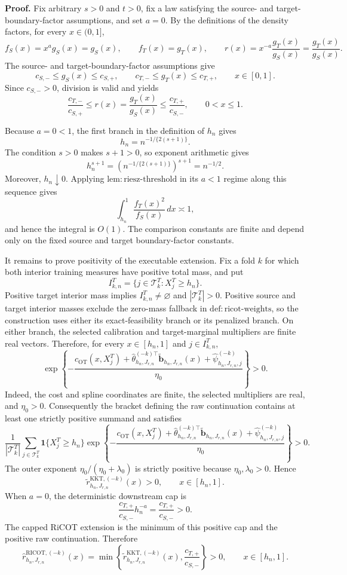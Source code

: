 \textbf{Proof.}
Fix arbitrary \(s>0\) and \(t>0\), fix a law satisfying the source- and target-boundary-factor assumptions, and set \(a=0\). By the definitions of the density factors, for every \(x\in(0,1]\),
\[
f_S(x)=x^a g_S(x)=g_S(x),
\qquad
f_T(x)=g_T(x),
\qquad
r(x)=x^{-a}\frac{g_T(x)}{g_S(x)}=\frac{g_T(x)}{g_S(x)}.
\]
The source- and target-boundary-factor assumptions give
\[
c_{S,-}\le g_S(x)\le c_{S,+},
\qquad
c_{T,-}\le g_T(x)\le c_{T,+},
\qquad x\in[0,1].
\]
Since \(c_{S,-}>0\), division is valid and yields
\[
\frac{c_{T,-}}{c_{S,+}}
\le r(x)=\frac{g_T(x)}{g_S(x)}
\le \frac{c_{T,+}}{c_{S,-}},
\qquad 0<x\le1.
\]

Because \(a=0<1\), the first branch in the definition of \(h_n\) gives
\[
h_n=n^{-1/\{2(s+1)\}}.
\]
The condition \(s>0\) makes \(s+1>0\), so exponent arithmetic gives
\[
h_n^{s+1}
=\left(n^{-1/\{2(s+1)\}}\right)^{s+1}
=n^{-1/2}.
\]
Moreover, \(h_n\downarrow0\). Applying \(\mathrm{lem{:}riesz\text{-}threshold}\) in its \(a<1\) regime along this sequence gives
\[
\int_{h_n}^1\frac{f_T(x)^2}{f_S(x)}\,dx\asymp1,
\]
and hence the integral is \(O(1)\). The comparison constants are finite and depend only on the fixed source and target boundary-factor constants.

It remains to prove positivity of the executable extension. Fix a fold \(k\) for which both interior training measures have positive total mass, and put
\[
I^T_{k,n}=\{j\in\mathcal T^T_k:X_j^T\ge h_n\}.
\]
Positive target interior mass implies \(I^T_{k,n}\ne\varnothing\) and \(|\mathcal T^T_k|>0\). Positive source and target interior masses exclude the zero-mass fallback in \(\mathrm{def{:}ricot\text{-}weights}\), so the construction uses either its exact-feasibility branch or its penalized branch. On either branch, the selected calibration and target-marginal multipliers are finite real vectors. Therefore, for every \(x\in[h_n,1]\) and \(j\in I^T_{k,n}\),
\[
\exp\!\left\{-\frac{c_{\mathrm{OT}}(x,X_j^T)
+\widehat\theta_{h_n,J_{r,n}}^{(-k)\top}
\widetilde{\mathbf b}_{h_n,J_{r,n}}(x)
+\widehat\psi^{(-k)}_{h_n,J_{r,n},j}}{\eta_0}\right\}>0.
\]
Indeed, the cost and spline coordinates are finite, the selected multipliers are real, and \(\eta_0>0\). Consequently the bracket defining the raw continuation contains at least one strictly positive summand and satisfies
\[
\frac{1}{|\mathcal T^T_k|}
\sum_{j\in\mathcal T^T_k}\mathbf 1\{X_j^T\ge h_n\}
\exp\!\left\{-\frac{c_{\mathrm{OT}}(x,X_j^T)
+\widehat\theta_{h_n,J_{r,n}}^{(-k)\top}
\widetilde{\mathbf b}_{h_n,J_{r,n}}(x)
+\widehat\psi^{(-k)}_{h_n,J_{r,n},j}}{\eta_0}\right\}>0.
\]
The outer exponent \(\eta_0/(\eta_0+\lambda_0)\) is strictly positive because \(\eta_0,\lambda_0>0\). Hence
\[
\widetilde r^{\mathrm{KKT},(-k)}_{h_n,J_{r,n}}(x)>0,
\qquad x\in[h_n,1].
\]
When \(a=0\), the deterministic downstream cap is
\[
\frac{c_{T,+}}{c_{S,-}}h_n^{-a}=\frac{c_{T,+}}{c_{S,-}}>0.
\]
The capped RiCOT extension is the minimum of this positive cap and the positive raw continuation. Therefore
\[
\widehat r^{\mathrm{RICOT},(-k)}_{h_n,J_{r,n}}(x)
=\min\!\left\{
\widetilde r^{\mathrm{KKT},(-k)}_{h_n,J_{r,n}}(x),
\frac{c_{T,+}}{c_{S,-}}
\right\}>0,
\qquad x\in[h_n,1].
\]


